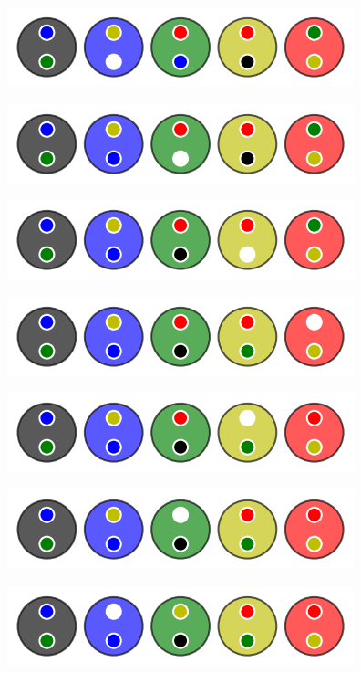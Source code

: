 \begin{multicols}{2}
    \begin{center}   %
        \includegraphics[scale= 0.45]{content/algo_bubble/example/000.png}

        \includegraphics[scale= 0.45]{content/algo_bubble/example/001.png}

        \includegraphics[scale= 0.45]{content/algo_bubble/example/002.png}

        \includegraphics[scale= 0.45]{content/algo_bubble/example/003.png}

        \includegraphics[scale= 0.45]{content/algo_bubble/example/004.png}

        \includegraphics[scale= 0.45]{content/algo_bubble/example/005.png}

        \includegraphics[scale= 0.45]{content/algo_bubble/example/006.png}


\end{center}
\end{multicols}
